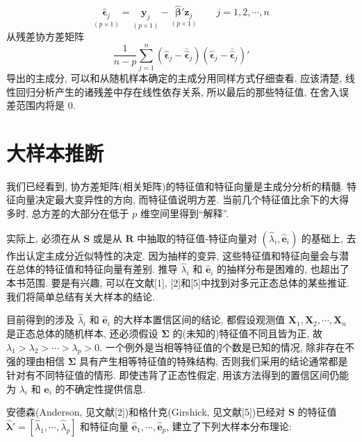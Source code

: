 
\label{eq:8-31}
\begin{equation}
\underset{(p\times 1)}{\hat{\boldsymbol{\epsilon}}_j}=\underset{(p\times 1)}{\mathbf{y}_j}-\underset{(p\times 1)}{\hat{\boldsymbol{\beta}}'\mathbf{z}_j}\qquad j=1,2,\cdots,n \tag{8-31}
\end{equation}
从残差协方差矩阵
\label{eq:8-32}
\begin{equation}
\frac{1}{n-p}\sum_{j=1}^{n}(\hat{\boldsymbol{\epsilon}}_j-\bar{\hat{\boldsymbol{\epsilon}}}_j)(\hat{\boldsymbol{\epsilon}}_j-\bar{\hat{\boldsymbol{\epsilon}}}_j)' \tag{8-32}
\end{equation}
导出的主成分, 可以和从随机样本确定的主成分用同样方式仔细查看. 应该清楚, 线性回归分析产生的诸残差中存在线性依存关系, 所以最后的那些特征值, 在舍入误差范围内将是 0.

\section{大样本推断}  %
\label{sec:8.5}

我们已经看到, 协方差矩阵(相关矩阵)的特征值和特征向量是主成分分析的精髓. 特征向量决定最大变异性的方向, 而特征值说明方差. 当前几个特征值比余下的大得多时, 总方差的大部分在低于 $p$ 维空间里得到“解释”.

实际上, 必须在从 $\mathbf{S}$ 或是从 $\mathbf{R}$ 中抽取的特征值-特征向量对 $(\hat{\lambda}_i,\hat{\mathbf{e}}_i)$ 的基础上, 去作出认定主成分近似特性的决定. 因为抽样的变异, 这些特征值和特征向量会与潜在总体的特征值和特征向量有差别. 推导 $\hat{\lambda}_i$ 和 $\hat{\mathbf{e}}_i$ 的抽样分布是困难的, 也超出了本书范围. 要是有兴趣, 可以在文献[1], [2]和[5]中找到对多元正态总体的某些推证. 我们将简单总结有关大样本的结论.


目前得到的涉及 $\hat{\lambda}_i$ 和 $\hat{\mathbf{e}}_i$ 的大样本置信区间的结论, 都假设观测值 $\mathbf{X}_1,\mathbf{X}_2,\cdots,\mathbf{X}_n$ 是正态总体的随机样本, 还必须假设 $\boldsymbol{\Sigma}$ 的(未知的)特征值不同且皆为正, 故 $\lambda_1>\lambda_2>\cdots>\lambda_p>0$. 一个例外是当相等特征值的个数是已知的情况, 除非存在不强的理由相信 $\boldsymbol{\Sigma}$ 具有产生相等特征值的特殊结构, 否则我们采用的结论通常都是针对有不同特征值的情形. 即使违背了正态性假定, 用该方法得到的置信区间仍能为 $\lambda_i$ 和 $\mathbf{e}_i$ 的不确定性提供信息.

安德森(Anderson, 见文献[2])和格什克(Girshick, 见文献[5])已经对 $\mathbf{S}$ 的特征值 $\hat{\boldsymbol{\lambda}}'=[\hat{\lambda}_1,\cdots,\hat{\lambda}_p]$ 和特征向量 $\hat{\mathbf{e}}_1,\cdots,\hat{\mathbf{e}}_p$, 建立了下列大样本分布理论:

